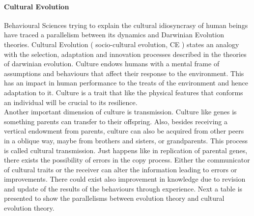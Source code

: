 \documentclass[11pt,oneside,a4paper,openright]{report}
\begin{document}
\paragraph{Cultural Evolution}
\label{sec:CultEvol}
Behavioural Sciences trying to explain the cultural idiosyncrasy of human beings have traced a parallelism between its dynamics and Darwinian Evolution theories. Cultural Evolution \cite[ch11.]{Dawkins1990}\cite{Stanford_CultEvol}( socio-cultural evolution, CE ) states an analogy with the selection, adaptation and innovation processes described in the theories of darwinian evolution. Culture endows humans with a mental frame of assumptions and behaviours that affect their response to the environment. This has an impact in human performance to the treats of the environment and hence adaptation to it. Culture is a trait that like the physical features that conforms an individual will be crucial to its resilience.\\ 
Another important dimension of culture is transmission. Culture like genes is something parents can transfer to their offspring. Also, besides receiving a vertical endowment from parents, culture can also be acquired from other peers in a oblique way, maybe from brothers and sisters, or grandparents. This process is called cultural transmission. Just happens like in replication of parental genes, there exists the possibility of errors in the copy process. Either the communicator of cultural traits or the receiver can alter the information leading to errors or improvements. There could exist also improvement in knowledge due to revision and update of the results of the behaviours through experience. Next a table is presented to show the parallelisms between evolution theory and cultural evolution theory.
\end{document}
